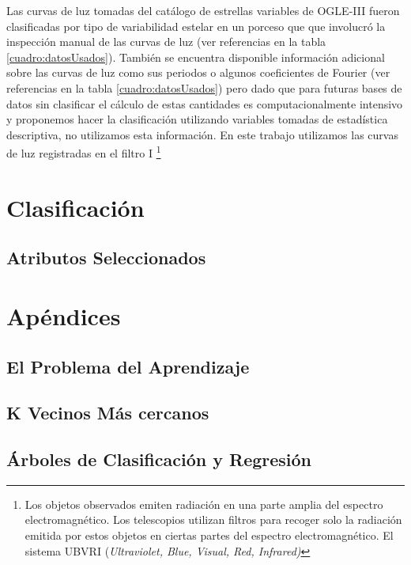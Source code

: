 \documentclass[letterpaper,12pt]{book}
\begin{document}
Las curvas de luz tomadas del catálogo de estrellas variables de OGLE-III fueron clasificadas por tipo de variabilidad estelar en un porceso que que involucró la inspección manual de las curvas de luz (ver referencias en la tabla \ref{cuadro:datosUsados}). También se encuentra disponible información adicional sobre las curvas de luz como sus periodos o algunos coeficientes de Fourier (ver referencias en la tabla \ref{cuadro:datosUsados}) pero dado que para futuras bases de datos sin clasificar el cálculo de estas cantidades es computacionalmente intensivo y proponemos hacer la clasificación utilizando variables tomadas de estadística descriptiva, no utilizamos esta información. En este trabajo utilizamos las curvas de luz registradas en el filtro I \footnote{Los objetos observados emiten radiación en una parte amplia del espectro electromagnético. Los telescopios utilizan filtros para recoger solo la radiación emitida por estos objetos en ciertas partes del espectro electromagnético. El sistema UBVRI (\textit{Ultraviolet, Blue, Visual, Red, Infrared)}  }  

\chapter{Clasificación}\label{cap:clasificacion}



\section{Atributos Seleccionados \label{sec:atributos}}




\chapter{Apéndices}

\section{El Problema del Aprendizaje\label{cap:problemaAprendizaje}}

\section{K Vecinos Más cercanos}

\section{Árboles de Clasificación y Regresión}
\end{document}
